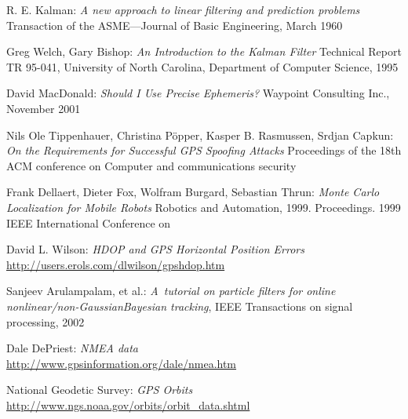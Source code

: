 \clearpage
{}
\begin{thebibliography}{99}


R. E. Kalman:
\emph{A new approach to linear filtering and prediction problems}
Transaction of the ASME—Journal of Basic Engineering, March 1960

Greg Welch,
Gary Bishop:
\emph{An Introduction to the Kalman Filter}
Technical Report TR 95-041, University of North Carolina,
Department of Computer Science, 1995

David MacDonald:
\emph{Should I Use Precise Ephemeris?}
Waypoint Consulting Inc.,
November 2001

Nils Ole Tippenhauer,
Christina Pöpper,
Kasper B. Rasmussen,
Srdjan Capkun:
\emph{On the Requirements for Successful GPS Spoofing Attacks}
Proceedings of the 18th ACM conference on Computer and communications security



Frank Dellaert,
Dieter Fox,
Wolfram Burgard,
Sebastian Thrun:
\emph{Monte Carlo Localization for Mobile Robots}
Robotics and Automation, 1999. Proceedings. 1999 IEEE International Conference on


David L. Wilson:
\emph{HDOP and GPS Horizontal Position Errors} \\
\url{http://users.erols.com/dlwilson/gpshdop.htm}

Sanjeev Arulampalam, et al.:
{\em A~tutorial on particle filters for online nonlinear/non-GaussianBayesian tracking},
IEEE Transactions on signal processing, 2002

Dale DePriest:
\emph{NMEA data} \\
\url{http://www.gpsinformation.org/dale/nmea.htm}

National Geodetic Survey:
\emph{GPS Orbits} \\
\url{http://www.ngs.noaa.gov/orbits/orbit_data.shtml}

\end{thebibliography}
